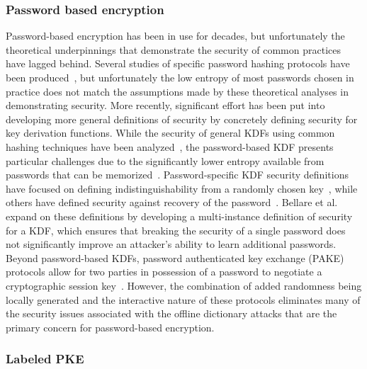 \subsubsection{Password based encryption}

Password-based encryption has been in use for decades, but unfortunately the theoretical underpinnings that demonstrate the
security of common practices have lagged behind.  Several studies of specific password hashing protocols have been produced~\cite{LR88,WG00,Boyen07},
but unfortunately the low entropy of most passwords chosen in practice does not match the assumptions made by these
theoretical analyses in demonstrating security.  More recently, significant effort has been put into developing more general definitions
of security by concretely defining security for key derivation functions.  While the security of general KDFs using common hashing techniques have been
analyzed~\cite{DGHKR04}, the password-based KDF presents particular challenges due to the significantly lower entropy available from
passwords that can be memorized~\cite{Kraw10}.  Password-specific KDF security definitions have focused on defining indistinguishability from
a randomly chosen key~\cite{YY05}, while others have defined security against recovery of the password~\cite{KSHW98,AW05}.  Bellare et al.~\cite{BRT12}
expand on these definitions by developing a multi-instance definition of security for a KDF, which ensures that breaking the
security of a single password does not significantly improve an attacker's ability to learn additional passwords.
Beyond password-based KDFs, password authenticated key exchange (PAKE) protocols allow for two parties in possession of a password
to negotiate a cryptographic session key~\cite{BPR00,GL03,CHKLM05}.  However, the combination of added randomness being locally generated and the interactive
nature of these protocols eliminates many of the security issues associated with the offline dictionary attacks that are the primary concern for
password-based encryption.

\subsubsection{Labeled PKE}

